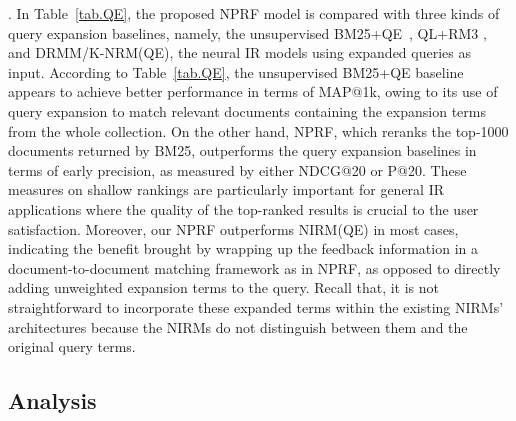 \documentclass[11pt,a4paper]{article}
\begin{document}
. In Table~\ref{tab.QE}, the proposed NPRF model is compared with three kinds of query expansion baselines, namely,
the unsupervised BM25+QE~\cite{DBLP:conf/trec/YeHHYL09}, QL+RM3 \cite{DBLP:conf/sigir/LavrenkoC01}, and DRMM/K-NRM(QE), the neural IR models using expanded queries as input. 
According to Table~\ref{tab.QE}, the unsupervised BM25+QE baseline appears to achieve
better performance in terms of MAP@1k, owing to its use of 
query expansion to match relevant documents containing the expansion terms from the whole collection. 
On the other hand, NPRF, which reranks the top-1000 documents returned by BM25, outperforms the query expansion baselines in terms of early precision, as measured by either NDCG@20 or P@20. These measures on shallow rankings are particularly important for general IR applications 
where the quality of the top-ranked results is crucial to the user satisfaction. 
Moreover, our NPRF outperforms NIRM(QE) in most cases, indicating the benefit brought by wrapping up the feedback information in a document-to-document matching framework as in NPRF, as opposed to directly adding unweighted expansion terms to the query. 
Recall that, it is not straightforward to incorporate these expanded terms within the existing NIRMs' architectures because the NIRMs do not distinguish between them and the original query terms.

\vspace{\vignore}
\subsection{Analysis}\label{sec.analysis}
\vspace{\vignore}
\end{document}
